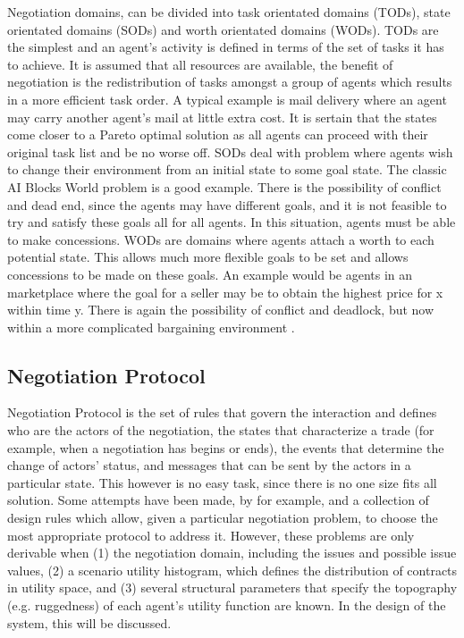 Negotiation domains, can be divided into task orientated domains (TODs), state orientated domains (SODs) and worth orientated domains (WODs). TODs are the simplest and an agent's activity is defined in terms of the set of tasks it has to achieve. It is assumed that all resources are available, the benefit of negotiation is the redistribution of tasks amongst a group of agents which results in a more efficient task order. A typical example is mail delivery where an agent may carry another agent's mail at little extra cost. It is sertain that the states come closer to a Pareto optimal solution as all agents can proceed with their original task list and be no worse off. SODs deal with problem where agents wish to change their environment from an initial state to some goal state. The classic AI Blocks World problem is a good example. There is the possibility of conflict and dead end, since the agents may have different goals, and it is not feasible to try and satisfy these goals all for all agents. In this situation, agents must be able to make concessions. WODs are domains where agents attach a worth to each potential state. This allows much more flexible goals to be set and allows concessions to be made on these goals. An example would be agents in an marketplace where the goal for a seller may be to obtain the highest price for x within time y. There is again the possibility of conflict and deadlock, but now within a more complicated bargaining environment \citep{anumba2003negotiation, fatima2014negotiation} .

\subsection{Negotiation Protocol}
Negotiation Protocol is the set of rules that govern the interaction and defines who are the actors of the negotiation, the states that characterize a trade (for example, when a negotiation has begins or ends), the events that determine the change of actors’ status, and messages that can be sent by the actors in a particular state. This however is no easy task, since there is no one size fits all solution. Some attempts have been made, by \citet{marsa2014problems} for example, and a collection of design rules which allow, given a particular negotiation problem, to choose the most appropriate protocol to address it. However, these problems are only derivable when (1) the negotiation domain, including the issues and possible issue values, (2) a scenario utility histogram, which defines the distribution of contracts in utility space, and (3) several structural parameters that specify the topography (e.g. ruggedness) of each agent's utility function are known. In the design of the system, this will be discussed.

